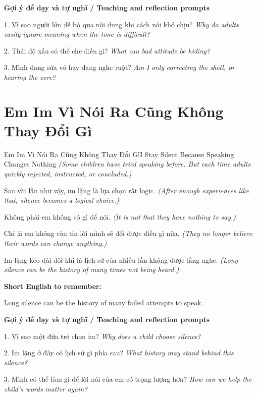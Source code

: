 \begin{tuhocnhanh}
\textbf{Gợi ý để dạy và tự nghĩ / Teaching and reflection prompts}

1. Vì sao người lớn dễ bỏ qua nội dung khi cách nói khó chịu? \textit{Why do adults easily ignore meaning when the tone is difficult?}

2. Thái độ xấu có thể che điều gì? \textit{What can bad attitude be hiding?}

3. Mình đang sửa vỏ hay đang nghe ruột? \textit{Am I only correcting the shell, or hearing the core?}
\end{tuhocnhanh}
\ngancach

\section{Em Im Vì Nói Ra Cũng Không Thay Đổi Gì}
\begin{truyen}{Em Im Vì Nói Ra Cũng Không Thay Đổi Gì}{I Stay Silent Because Speaking Changes Nothing}
\textit{(Some children have tried speaking before. But each time adults quickly rejected, instructed, or concluded.)}

Sau vài lần như vậy, im lặng là lựa chọn rất logic.
\textit{(After enough experiences like that, silence becomes a logical choice.)}

Không phải em không có gì để nói.
\textit{(It is not that they have nothing to say.)}

Chỉ là em không còn tin lời mình sẽ đổi được điều gì nữa.
\textit{(They no longer believe their words can change anything.)}

\end{truyen}

\begin{baihoc}
Im lặng kéo dài đôi khi là lịch sử của nhiều lần không được lắng nghe.
\textit{(Long silence can be the history of many times not being heard.)}
\end{baihoc}

\begin{ghinhoanh}
\textbf{Short English to remember:}

Long silence can be the history of many failed attempts to speak.

\end{ghinhoanh}

\begin{tuhocnhanh}
\textbf{Gợi ý để dạy và tự nghĩ / Teaching and reflection prompts}

1. Vì sao một đứa trẻ chọn im? \textit{Why does a child choose silence?}

2. Im lặng ở đây có lịch sử gì phía sau? \textit{What history may stand behind this silence?}

3. Mình có thể làm gì để lời nói của em có trọng lượng hơn? \textit{How can we help the child's words matter again?}
\end{tuhocnhanh}
\ngancach

